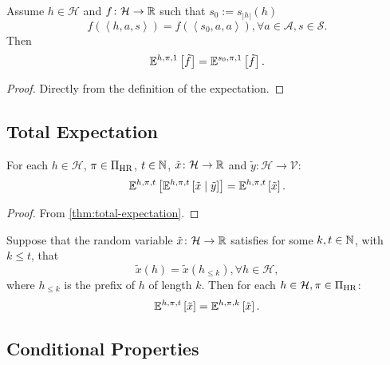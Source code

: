 \begin{theorem} \label{thm:exph-horizon-trim}
Assume $h \in \mathcal{H}$ and $f \colon \mathcal{H} \to \mathbb{R}$ such that $s_0 := s_{|h|}(h)$
\[
f(\left< h, a, s \right>) = f(\left< s_0, a, a \right>) , \forall a\in \mathcal{A}, s\in \mathcal{S}.
\]
Then
\[
\mathbb{E}^{h,\pi,1}\left[ \tilde{f} \right] =   
\mathbb{E}^{s_0,\pi,1}\left[ \tilde{f} \right].
\]
\end{theorem}
\begin{proof}
  Directly from the definition of the expectation.
\end{proof}

\subsection{Total Expectation}

\begin{theorem} \label{thm:total-expectation-h}
  For each $h\in \mathcal{H}$, $\pi\in \Pi_{\mathrm{HR}}$, $t\in \mathbb{N}$, $\tilde{x}\colon \mathcal{H} \to \mathbb{R}$ and $\tilde{y}\colon \mathcal{H} \to \mathcal{V}$:
  \[
    \mathbb{E}^{h, \pi, t} \left[ \mathbb{E}^{h, \pi, t} \left[  \tilde{x} \mid  \tilde{y} \right] \right]
    =
    \mathbb{E}^{h, \pi, t} \left[ \tilde{x} \right].
  \]
\end{theorem}
\begin{proof}
From \cref{thm:total-expectation}.
\end{proof}

\begin{theorem}\label{thm:exp-horizon-cut}
Suppose that the random variable $\tilde{x}\colon \mathcal{H} \to \mathbb{R}$ satisfies for some $k, t \in \mathbb{N}$, with $k \le t$, that
  \[
   \tilde{x}(h) = \tilde{x}(h_{\le k}) , \forall h\in  \mathcal{H},
 \]
 where $h_{\le k}$ is the prefix of $h$ of length $k$. Then for each $h\in \mathcal{H}, \pi\in \Pi_{\mathrm{HR}}$:
 \[
  \mathbb{E}^{h,\pi,t} \left[ \tilde{x} \right]  = \mathbb{E}^{h,\pi,k} \left[  \tilde{x} \right].
 \]
\end{theorem}


\subsection{Conditional Properties}

